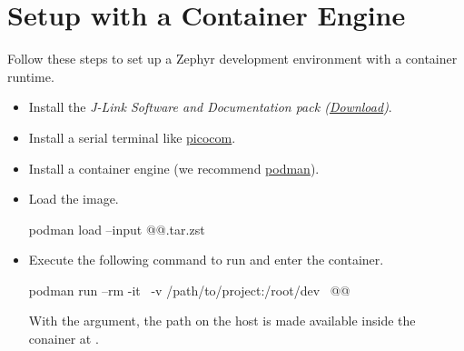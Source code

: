 \section{Setup with a Container Engine}

Follow these steps to set up a Zephyr development environment with a container runtime.

\begin{itemize}
  \item Install the \emph{J-Link Software and Documentation pack (\href{https://www.segger.com/downloads/jlink}{Download})}.
  \item Install a serial terminal like \href{https://formulae.brew.sh/formula/picocom}{picocom}.
  \item Install a container engine (we recommend \href{https://podman.io/docs/installation}{podman}).
  \item Load the image.
        \begin{monobox}
podman load --input @\imagename{}@.tar.zst
\end{monobox}
  \item Execute the following command to run and enter the container.
        \begin{monobox}
podman run --rm -it \
  -v /path/to/project:/root/dev \
  @\imagename{}@
\end{monobox}
    With the  argument, the  path on the host is made available inside the conainer at .
\end{itemize}
